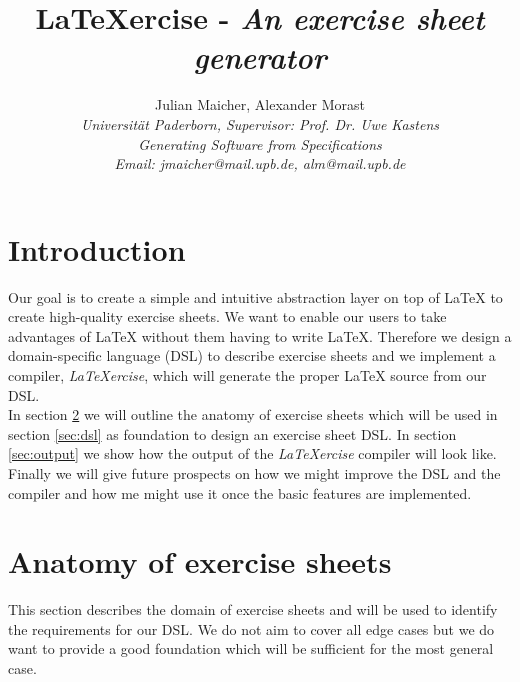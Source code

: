 \documentclass[12pt,letterpaper, onecolumn]{article}
\begin{document}
\title{LaTeXercise - \textit{An exercise sheet generator}}

\author{Julian Maicher, Alexander Morast \\
 \textit{Universit\"at Paderborn, Supervisor: Prof. Dr. Uwe Kastens} \\ 
 \textit{Generating Software from Specifications} \\
 \textit{Email: jmaicher@mail.upb.de, alm@mail.upb.de}\\
}

\maketitle
\thispagestyle{empty}

\section{Introduction}

Our goal is to create a simple and intuitive abstraction layer on top of \LaTeX{} to create high-quality exercise sheets. We want to enable our users to take advantages of \LaTeX{} without them having to write \LaTeX{}. Therefore we design a domain-specific language (DSL) to describe exercise sheets and we implement a compiler, \emph{LaTeXercise}, which will generate the proper \LaTeX{} source from our DSL.\\

In section \ref{sec:anatomy} we will outline the anatomy of exercise sheets which will be used in section \ref{sec:dsl} as foundation to design an exercise sheet DSL. In section \ref{sec:output} we show how the output of the \emph{LaTeXercise} compiler will look like. Finally we will give future prospects on how we might improve the DSL and the compiler and how me might use it once the basic features are implemented.\\

\section{Anatomy of exercise sheets}\label{sec:anatomy}

This section describes the domain of exercise sheets and will be used to identify the requirements for our DSL. We do not aim to cover all edge cases but we do want to provide a good foundation which will be sufficient for the most general case.\\
\end{document}
